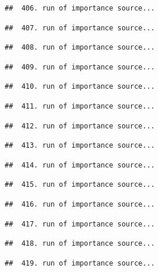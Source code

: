 \documentclass[
]{article}
\begin{document}
\begin{verbatim}
##  406. run of importance source...
\end{verbatim}

\begin{verbatim}
##  407. run of importance source...
\end{verbatim}

\begin{verbatim}
##  408. run of importance source...
\end{verbatim}

\begin{verbatim}
##  409. run of importance source...
\end{verbatim}

\begin{verbatim}
##  410. run of importance source...
\end{verbatim}

\begin{verbatim}
##  411. run of importance source...
\end{verbatim}

\begin{verbatim}
##  412. run of importance source...
\end{verbatim}

\begin{verbatim}
##  413. run of importance source...
\end{verbatim}

\begin{verbatim}
##  414. run of importance source...
\end{verbatim}

\begin{verbatim}
##  415. run of importance source...
\end{verbatim}

\begin{verbatim}
##  416. run of importance source...
\end{verbatim}

\begin{verbatim}
##  417. run of importance source...
\end{verbatim}

\begin{verbatim}
##  418. run of importance source...
\end{verbatim}

\begin{verbatim}
##  419. run of importance source...
\end{verbatim}
\end{document}
